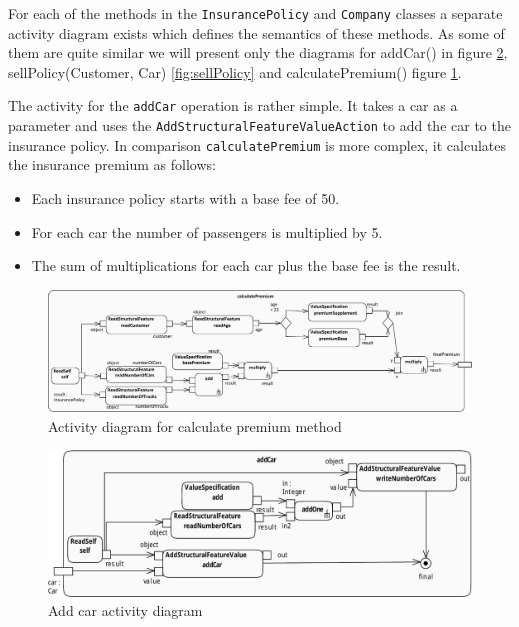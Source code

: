 \documentclass{llncs}
\begin{document}
For each of the methods in the \lstinline|InsurancePolicy| and \lstinline|Company| classes a separate activity diagram exists
which defines the semantics of these methods. As some of them are quite similar we will present only the diagrams for
addCar() in figure \ref{fig:addCar}, sellPolicy(Customer, Car) \ref{fig:sellPolicy} and calculatePremium() figure \ref{fig:calculatePremium}.


The activity for the \lstinline|addCar| operation is rather simple. It takes a car as a parameter and uses the
\lstinline|AddStructuralFeatureValueAction| to add the car to the insurance policy. In comparison \lstinline|calculatePremium| is
more complex, it calculates the insurance premium as follows:

\begin{itemize}
 \item Each insurance policy starts with a base fee of 50.
 \item For each car the number of passengers is multiplied by 5.
 \item The sum of multiplications for each car plus the base fee is the result.
\end{itemize}

\begin{figure}[h!t]
 \centering
 \includegraphics[scale=0.45]{images/calculatePremium.pdf}
 \caption{Activity diagram for calculate premium method}
 \label{fig:calculatePremium}
\end{figure}

\begin{figure}[ht]
 \centering
 \includegraphics[scale=0.7]{images/addCar-activity_diagram}
 \caption{Add car activity diagram}
 \label{fig:addCar}
\end{figure}
\end{document}
